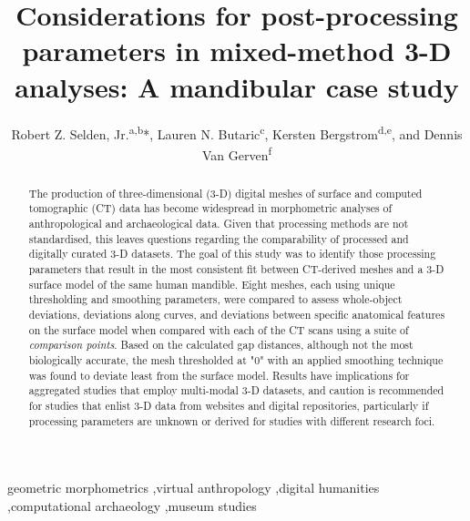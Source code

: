 \documentclass[review]{elsarticle}
\begin{document}
\begin{frontmatter}

\title{Considerations for post-processing parameters in mixed-method 3-D analyses: A mandibular case study}


\author{Robert Z. Selden, Jr.\textsuperscript{a,b}*, Lauren N. Butaric\textsuperscript{c}, Kersten Bergstrom\textsuperscript{d,e}, and Dennis Van Gerven\textsuperscript{f}}
\address[1]{Heritage Research Center, Stephen F. Austin State University, USA}
\address[2]{Cultural Heritage Department, Jean Monnet University, FR}
\address[3]{Department of Anatomy, Des Moines University, USA}
\address[4]{Department of Anthropology, Texas A\&M University, USA}
\address[5]{School of Biological Sciences, Washington State University-Tri-Cities, USA}
\address[6]{Department of Anthropology, University of Colorado Boulder, USA}

\begin{abstract}
The production of three-dimensional (3-D) digital meshes of surface and computed tomographic (CT) data has become widespread in morphometric analyses of anthropological and archaeological data. Given that processing methods are not standardised, this leaves questions regarding the comparability of processed and digitally curated 3-D datasets. The goal of this study was to identify those processing parameters that result in the most consistent fit between CT-derived meshes and a 3-D surface model of the same human mandible. Eight meshes, each using unique thresholding and smoothing parameters, were compared to assess whole-object deviations, deviations along curves, and deviations between specific anatomical features on the surface model when compared with each of the CT scans using a suite of \textit{comparison points}. Based on the calculated gap distances, although not the most biologically accurate, the mesh thresholded at "0" with an applied smoothing technique was found to deviate least from the surface model. Results have implications for aggregated studies that employ multi-modal 3-D datasets, and caution is recommended for studies that enlist 3-D data from websites and digital repositories, particularly if processing parameters are unknown or derived for studies with different research foci.
\end{abstract}

\begin{keyword}
geometric morphometrics \sep virtual anthropology \sep digital humanities \sep computational archaeology \sep museum studies
\end{keyword}

\end{frontmatter}
\end{document}
